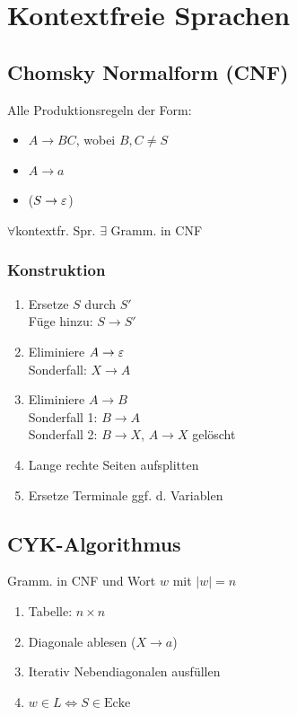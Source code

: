 \section*{Kontextfreie Sprachen}

\subsection*{Chomsky Normalform (CNF)}
Alle Produktionsregeln der Form:
\begin{itemize}
	\item $A \to BC$, wobei $B,C \neq S$
	\item $A \to a$
	\item ($S \to \varepsilon$)
\end{itemize}

$\forall$kontextfr. Spr. $\exists$ Gramm. in CNF
\subsubsection*{Konstruktion}
\begin{enumerate}
	\item Ersetze $S$ durch $S'$\\
		Füge hinzu: $S \to S'$

	\item Eliminiere $A \to \varepsilon$ \\
		Sonderfall: $X \to A$

	\item Eliminiere $A \to B$ \\
		Sonderfall 1: $B \to A$ \\
		Sonderfall 2: $B \to X$, $A \to X$ gelöscht

	\item Lange rechte Seiten aufsplitten

	\item Ersetze Terminale ggf. d. Variablen
\end{enumerate}

\subsection*{CYK-Algorithmus}
Gramm. in CNF und Wort $w$ mit $|w|=n$
\begin{enumerate}
	\item Tabelle: $n \times n$
	\item Diagonale ablesen ($X \to a$)
	\item Iterativ Nebendiagonalen ausfüllen
	\item $w \in L \iff S \in \text{Ecke}$
\end{enumerate}

